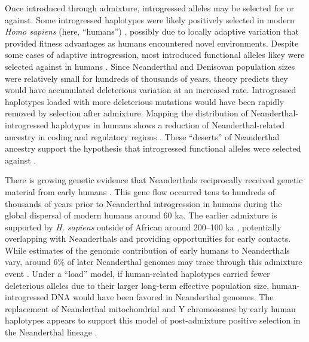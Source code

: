 \documentclass{article}
\begin{document}
Once introduced through admixture, introgressed alleles may be selected for or
against. Some introgressed haplotypes were likely positively selected in modern
\emph{Homo sapiens} (here, ``humans'') \citep{huerta2014altitude,
racimo2017signatures, enard2018evidence, gower2021detecting}, possibly due to
locally adaptive variation that provided fitness advantages as humans
encountered novel environments. Despite some cases of adaptive introgression,
most introduced functional alleles likey were selected against in humans
\citep{harris2016genetic, juric2016strength, veller2023recombination}. Since
Neanderthal and Denisovan population sizes were relatively small for hundreds
of thousands of years, theory predicts they would have accumulated deleterious
variation at an increased rate. Introgressed haplotypes loaded with more
deleterious mutations would have been rapidly removed by selection after
admixture. Mapping the distribution of Neanderthal-introgressed haplotypes in
humans shows a reduction of Neanderthal-related ancestry in coding and
regulatory regions \citep{petr2019limits, telis2020selection,
yermakovich2023long}. These ``deserts'' of Neanderthal ancestry support the
hypothesis that introgressed functional alleles were selected against
\citep{sankararaman2014genomic, sankararaman2016combined}.

There is growing genetic evidence that Neanderthals reciprocally received
genetic material from early humans \citep{kuhlwilm2016ancient,
hubisz2020mapping, harris2023diverse, li2024recurrent}. This gene flow occurred
tens to hundreds of thousands of years prior to Neanderthal introgression in
humans during the global dispersal of modern humans around 60 ka. The earlier
admixture is supported by \emph{H. sapiens} outside of African around 200--100
ka \citep{schwarcz1988esr, grun2005u, harvati2019apidima, beyer2021climatic},
potentially overlapping with Neanderthals and providing opportunities for early
contacts. While estimates of the genomic contribution of early humans to
Neanderthals vary, around $6\%$ of later Neanderthal genomes may trace through
this admixture event \citep{harris2023diverse}. Under a ``load'' model, if
human-related haplotypes carried fewer deleterious alleles due to their larger
long-term effective population size, human-introgressed DNA would have been
favored in Neanderthal genomes. The replacement of Neanderthal mitochondrial
and Y chromosomes by early human haplotypes appears to support this model of
post-admixture positive selection in the Neanderthal lineage
\citep{posth2017deeply, petr2020evolutionary}.
\end{document}

